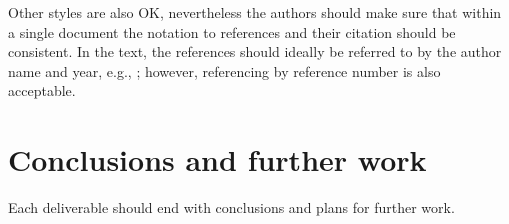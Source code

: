 \documentclass[10pt]{report}
\begin{document}
Other styles are also OK, nevertheless the authors should make sure
that within a single document the notation to references and their
citation should be consistent. In the text, the references should
ideally be referred to by the author name and year, e.g.,
\cite{bib:lamport1994latex}; however, referencing by reference number
is also acceptable.


\section{Conclusions and further work}

Each deliverable should end with conclusions and plans for further work.






\end{document}
